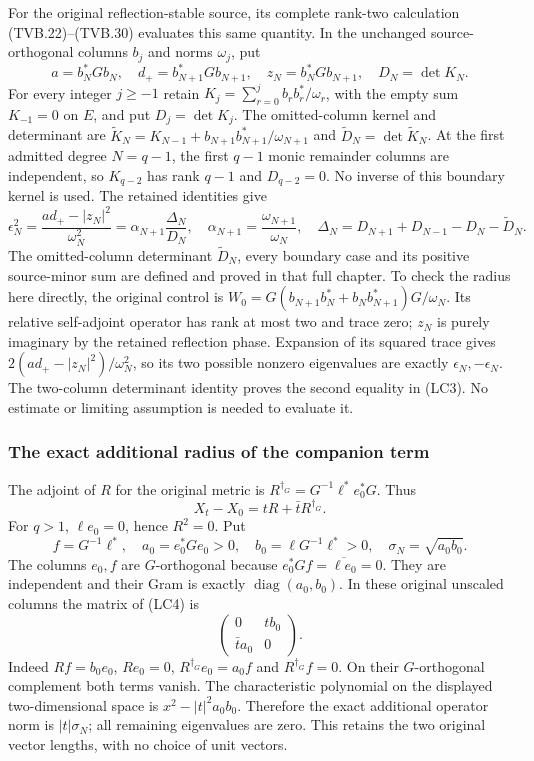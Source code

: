 For the original reflection-stable source, its complete rank-two
calculation (TVB.22)--(TVB.30) evaluates this same quantity. In the
unchanged source-orthogonal columns \(b_j\) and norms \(\omega_j\),
put
\[
 a=b_N^*Gb_N,\quad d_+=b_{N+1}^*Gb_{N+1},\quad
 z_N=b_N^*Gb_{N+1},\quad D_N=\det K_N.
\]
For every integer $j\ge-1$ retain
$K_j=\sum_{r=0}^{j}b_rb_r^*/\omega_r$, with the empty sum
$K_{-1}=0$ on $E$, and put $D_j=\det K_j$.
The omitted-column kernel and determinant are
$\widetilde K_N=K_{N-1}+b_{N+1}b_{N+1}^*/\omega_{N+1}$ and
$\widetilde D_N=\det\widetilde K_N$.
At the first admitted degree $N=q-1$, the first $q-1$ monic
remainder columns are independent, so $K_{q-2}$ has rank $q-1$
and $D_{q-2}=0$. No inverse of this boundary kernel is used.
The retained identities give
\[
 \epsilon_N^2=\frac{ad_+-|z_N|^2}{\omega_N^2}
       =\alpha_{N+1}\frac{\Delta_N}{D_N},
 \quad\alpha_{N+1}=\frac{\omega_{N+1}}{\omega_N},
 \quad
 \Delta_N=D_{N+1}+D_{N-1}-D_N-\widetilde D_N.
 \tag{LC3}
\]
The omitted-column determinant \(\widetilde D_N\), every boundary
case and its positive source-minor sum are defined and proved in
that full chapter. To check the radius here directly, the original
control is
\(W_0=G(b_{N+1}b_N^*+b_Nb_{N+1}^*)G/\omega_N\).
Its relative self-adjoint operator has rank at most two and trace
zero; \(z_N\) is purely imaginary by the retained reflection phase.
Expansion of its squared trace gives
\(2(ad_+-|z_N|^2)/\omega_N^2\), so its two possible nonzero
eigenvalues are exactly \(\epsilon_N,-\epsilon_N\).
The two-column determinant identity proves the second equality
in (LC3). No estimate or limiting assumption is needed to evaluate it.

\subsubsection{The exact additional radius of the companion term}

The adjoint of \(R\) for the original metric is
\(R^{\dagger_G}=G^{-1}\ell^*e_0^*G\). Thus
\[
 X_t-X_0=tR+\bar tR^{\dagger_G}.
 \tag{LC4}
\]
For \(q>1\), \(\ell e_0=0\), hence \(R^2=0\). Put
\[
 f=G^{-1}\ell^*,\quad a_0=e_0^*Ge_0>0,\quad
 b_0=\ell G^{-1}\ell^*>0,\quad
 \sigma_N=\sqrt{a_0b_0}.
 \tag{LC5}
\]
The columns \(e_0,f\) are \(G\)-orthogonal because
\(e_0^*Gf=\overline{\ell e_0}=0\). They are independent and their
Gram is exactly \(\operatorname{diag}(a_0,b_0)\). In these original
unscaled columns the matrix of (LC4) is
\[
 \begin{pmatrix}0&t b_0\\\bar t a_0&0\end{pmatrix}.
 \tag{LC6}
\]
Indeed \(Rf=b_0e_0\), \(R e_0=0\),
\(R^{\dagger_G}e_0=a_0 f\) and
\(R^{\dagger_G}f=0\). On their \(G\)-orthogonal complement both
terms vanish. The characteristic polynomial on the displayed
two-dimensional space is \(x^2-|t|^2a_0b_0\). Therefore the exact
additional operator norm is \(|t|\sigma_N\); all remaining
eigenvalues are zero. This retains the two original vector lengths,
with no choice of unit vectors.

